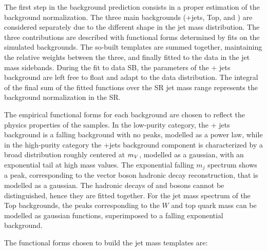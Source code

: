 The first step in the background prediction consists in a proper estimation of the background normalization. The three main backgrounds (\V+jets, Top, and \V\V) are considered separately due to the different shape in the jet mass distribution. The three contributions are described with functional forms determined by fits on the simulated backgrounds. The so-built templates are summed together, maintaining the relative weights between the three, and finally fitted to the data in the jet mass sidebands. During the fit to data SB, the parameters of the \V + jets background are left free to float and adapt to the data distribution. The integral of the final sum of the fitted functions over the SR jet mass range represents the background normalization in the SR.


\noindent The empirical functional forms for each background are chosen to reflect the physics properties of the samples. In the low-purity category, the \V+ jets background is a falling background with no peaks, modelled as a power law, while in the high-purity category the \V+jets background component is characterized by a broad distribution roughly centered at $m_V$, modelled as a gaussian, with an exponential tail at high mass values. The exponential falling \V\V $m_j$ spectrum shows a peak, corresponding to the vector boson hadronic decay reconstruction, that is modelled as a gaussian. The hadronic decays of \W and \Z bosons cannot be distinguished, hence they are fitted together. For the jet mass spectrum of the Top backgrounds, the peaks corresponding to the $W$ and top quark mass can be modelled as gaussian functions, superimposed to a falling exponential background.

\noindent The functional forms chosen to build the jet mass templates are:

